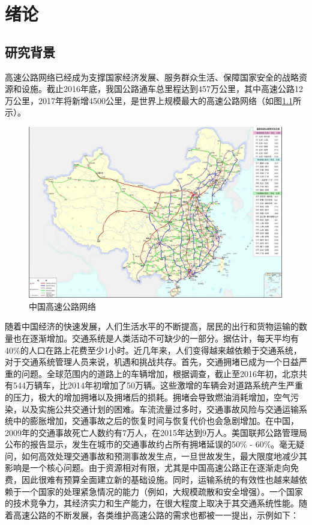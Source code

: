 
\chapter{绪论}
\section{研究背景}

高速公路网络已经成为支撑国家经济发展、服务群众生活、保障国家安全的战略资源和设施。截止2016年底，我国公路通车总里程达到457万公里，其中高速公路12万公里，2017年将新增4500公里，是世界上规模最大的高速公路网络（如图\ref{gaosugonglu}所示）。 

				\begin{figure}[h]
				\centering
						\begin{minipage}{0.8\linewidth}
							\centering
							\includegraphics[width=4.4in]{picture/gaosugonglu}
							\caption{中国高速公路网络}
							\label{gaosugonglu}
						\end{minipage}%
				\end{figure}

随着中国经济的快速发展，人们生活水平的不断提高，居民的出行和货物运输的数量也在逐渐增加。交通系统是人类活动不可缺少的一部分。据估计，每天平均有40\%的人口在路上花费至少1小时。近几年来，人们变得越来越依赖于交通系统，对于交通系统管理人员来说，机遇和挑战共存。首先，交通拥堵已成为一个日益严重的问题。全球范围内的道路上的车辆增加，根据调查，截止至2016年初，北京共有544万辆车，比2014年初增加了50万辆。这些激增的车辆会对道路系统产生严重的压力，极大的增加拥堵以及拥堵后的损耗。拥堵会导致燃油消耗增加，空气污染，以及实施公共交通计划的困难。车流流量过多时，交通事故风险与交通运输系统中的膨胀增加，交通事故之后的恢复时间与恢复代价也会急剧增加。在中国，2009年的交通事故死亡人数约有7万人，在2015年达到9万人。美国联邦公路管理局公布的报告显示，发生在城市的交通事故约占所有拥堵延误的50\% - 60\%。毫无疑问，如何高效处理交通事故和预测事故发生点，一旦世故发生，最大限度地减少其影响是一个核心问题。由于资源相对有限，尤其是中国高速公路正在逐渐走向免费，因此很难有预算全面建立新的基础设施。同时，运输系统的有效性也越来越依赖于一个国家的处理紧急情况的能力（例如，大规模疏散和安全增强）。一个国家的技术竞争力，其经济实力和生产能力，在很大程度上取决于其交通系统性能。随着高速公路的不断发展，各类维护高速公路的需求也都被一一提出，示例如下：

